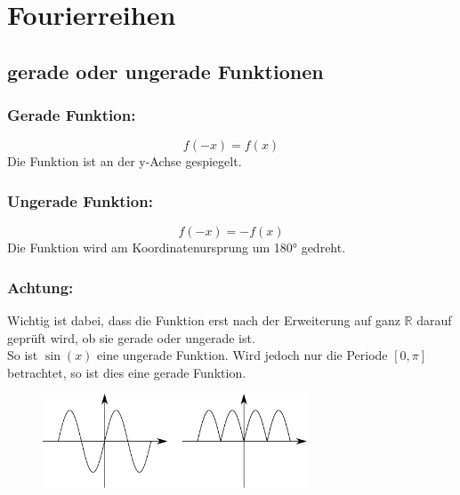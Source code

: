 



\section{Fourierreihen}

\subsection{gerade oder ungerade Funktionen}

\subsubsection{Gerade Funktion: }
\[ \boxed{f(-x) = f(x)} \]
Die Funktion ist an der y-Achse gespiegelt. 
\subsubsection{Ungerade Funktion: }
\[ \boxed{f(-x) = -f(x)} \]
Die Funktion wird am Koordinatenursprung um 180° gedreht. 
\subsubsection{Achtung: }
Wichtig ist dabei, dass die Funktion erst nach der Erweiterung auf ganz $\mathbb{R}$ darauf geprüft wird, ob sie gerade oder ungerade ist. \\
So ist $\sin(x)$ eine ungerade Funktion. Wird jedoch nur die Periode $[0, \pi]$ betrachtet, so ist dies eine gerade Funktion. 

\begin{figure}[h!]
\centering
\includegraphics[width=0.7\textwidth]{geradeungerade.pdf}
\end{figure}

